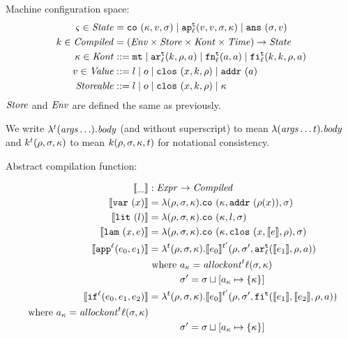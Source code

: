 \documentclass{llncs}
\newcommand{\alt}{\mid}
\begin{document}
Machine configuration space:
\begin{align*}
\mstate \in \State &= \co{\mkont, \mval, \msto} \alt
                     \ap[_\mlab^\mcntr]{\mval,\mval,\msto,\mkont} \alt
                     \ans{\msto, \mval}\\
\mcomp \in \Compiled &= (\Env \times \Store \times \Kont \times \Counter) \to \State \\
\mkont \in \Kont &::= \kmt \alt
                      \kar[_\mlab^\mcntr]{\mcomp, \menv, \maddr} \alt
                      \kfn[_\mlab^\mcntr]{\maddr, \maddr} \alt
                      \kif[_\mlab^\mcntr]{\mcomp, \mcomp, \menv, \maddr} \\
\mval \in \Value &::= \mlit \alt \mop \alt
                      \clos{\mvar,\mcomp,\menv} \alt
                      \spchoice{\saddr\maddr}{\superposition{\mval{s}}}
\spchoice{\\}{\\\mval{s} \in \wp(\Value)\\}
\Storeable &::= \mlit \alt \mop \alt
                \clos{\mvar,\mcomp,\menv} \alt
                \mkont \\
\end{align*}
$\mathit{Store}$ and $\mathit{Env}$ are defined the same as previously.

We write $\lambda^{t}(\mathit{args}\ldots). \mathit{body}$ (and without superscript) to mean
$\lambda(\mathit{args}\ldots {t}). \mathit{body}$ and
$k^{t}(\rho, \sigma, \kappa)$ to mean $k(\rho, \sigma,
\kappa, {t})$ for notational consistency.

Abstract compilation function:

\begin{align*}
\compile{\_} &: \Expr \to \Compiled \\
\compile{\svar\mvar} &= \lambda(\menv,\msto,\mkont) .
                          \co{\mkont, \spchoice{\saddr{\menv(\mvar)}}{\superposition{\msto(\menv(\mvar))}},\msto}
\\
\compile{\slit\mlit} &= \lambda(\menv,\msto,\mkont) .
\co{\mkont,\mlit,\msto}
\\
\compile{\slam\mvar\mexp} &= \lambda(\menv,\msto,\mkont) .
\co{\mkont,\clos{\mvar,\compile\mexp,\menv},\msto}
\\
\compile{\sapp[^\mlab]{\mexpi0}{\mexpi1}} &= \lambda^\mcntr (\menv,\msto,\mkont) .
\compile{\mexpi0}^{\mcntr'}(\menv,\msto',\kar[_\mlab^\mcntr]{\compile{\mexpi1},\menv,\maddr})
\\
&
\text{ where }\maddr_\mkont = \allockont^\mcntr\mlab(\msto,\mkont) \\
&\phantom{\text{ where }}\msto' = \msto\sqcup[\maddr_\mkont \mapsto \setof{\mkont}]
\\
\compile{\sif[^\mlab]{\mexpi0}{\mexpi1}{\mexpi2}} &= \lambda^\mcntr(\menv,\msto,\mkont) .
\compile{\mexpi0}^{\mcntr'}(\menv,\msto',\kif[^\mcntr]{\compile{\mexpi1},\compile{\mexpi2},\menv,\maddr})
\\
\text{ where }\maddr_\mkont = \allockont^\mcntr\mlab(\msto,\mkont) \\
&\phantom{\text{ where }}\msto' = \msto\sqcup[\maddr_\mkont \mapsto \setof{\mkont}]
\end{align*}
\end{document}
